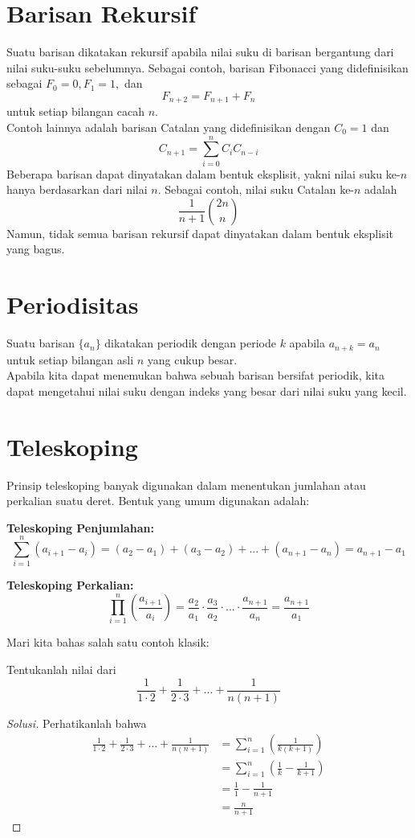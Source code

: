 \documentclass[11pt]{scrartcl}
\begin{document}
\section{Barisan Rekursif}
Suatu barisan dikatakan rekursif apabila nilai suku di barisan bergantung dari nilai suku-suku sebelumnya. Sebagai contoh, barisan Fibonacci yang didefinisikan sebagai $F_0 = 0, F_1 = 1,$ dan \[F_{n + 2} = F_{n + 1} + F_n\] untuk setiap bilangan cacah $n$.\\
Contoh lainnya adalah barisan Catalan yang didefinisikan dengan $C_0 = 1$ dan \[C_{n+1} = \sum_{i = 0}^n C_iC_{n-i}\]
Beberapa barisan dapat dinyatakan dalam bentuk eksplisit, yakni nilai suku ke-$n$ hanya berdasarkan dari nilai $n$. Sebagai contoh, nilai suku Catalan ke-$n$ adalah \[\dfrac{1}{n + 1} \binom{2n}{n}\]
Namun, tidak semua barisan rekursif dapat dinyatakan dalam bentuk eksplisit yang bagus.

\section{Periodisitas}
Suatu barisan $\{a_n\}$ dikatakan periodik dengan periode $k$ apabila $a_{n + k} = a_n$ untuk setiap bilangan asli $n$ yang cukup besar.\\
Apabila kita dapat menemukan bahwa sebuah barisan bersifat periodik, kita dapat mengetahui nilai suku dengan indeks yang besar dari nilai suku yang kecil.

\section{Teleskoping}

Prinsip teleskoping banyak digunakan dalam menentukan jumlahan atau perkalian suatu deret. Bentuk yang umum digunakan adalah:

\textbf{Teleskoping Penjumlahan:} \[\sum_{i=1}^n \left(a_{i+1} - a_i\right) = (a_2 - a_1) + (a_3 - a_2) + ... + (a_{n+1} - a_n) = a_{n+1} - a_1 \]

\textbf{Teleskoping Perkalian:} \[\prod_{i=1}^n \left(\frac{a_{i+1}}{a_i}\right) = \frac{a_2}{a_1} \cdot \frac{a_3}{a_2} \cdot ... \cdot \frac{a_{n+1}}{a_n} = \frac{a_{n+1}}{a_1}\]

Mari kita bahas salah satu contoh klasik:
\begin{example}
Tentukanlah nilai dari \[\frac{1}{1\cdot 2} + \frac{1}{2\cdot 3} + ... + \frac{1}{n(n+1)}\]
\end{example}

\begin{proof}[Solusi]
Perhatikanlah bahwa 
\begin{align*}
    \frac{1}{1\cdot 2} + \frac{1}{2\cdot 3} + ... + \frac{1}{n(n+1)} &= \sum_{i=1}^{n} \left(\frac{1}{k(k+1)}\right)\\
    &= \sum_{i=1}^{n} \left(\frac{1}{k} - \frac{1}{k+1}\right)\\
    &= \frac{1}{1} - \frac{1}{n+1}\\
    &= \frac{n}{n+1}
\end{align*}
\end{proof}
\end{document}
